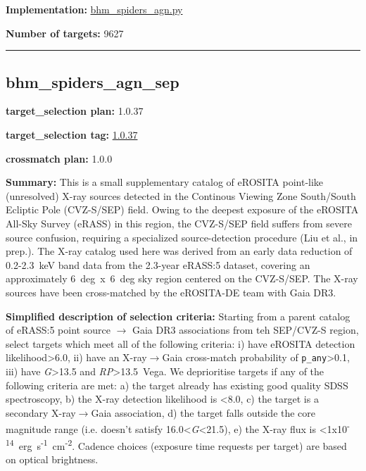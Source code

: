\noindent\textbf{Implementation:}
\href{https://github.com/sdss/target_selection/blob/1.0.37/python/target_selection/cartons/bhm_spiders_agn.py}{bhm\_spiders\_agn.py}

\noindent\textbf{Number of targets:} 9627

\begin{center}\rule{0.5\linewidth}{0.5pt}\end{center}

\hypertarget{bhm_spiders_agn_sep_plan1.0.37}{%
\subsection{bhm\_spiders\_agn\_sep}\label{bhm_spiders_agn_sep_plan1.0.37}}

\noindent\textbf{target\_selection plan:} 1.0.37

\noindent\textbf{target\_selection tag:}
\href{https://github.com/sdss/target_selection/tree/1.0.37/}{1.0.37}

\noindent\textbf{crossmatch plan:} 1.0.0

\noindent\textbf{Summary:} This is a small supplementary catalog of eROSITA
point-like (unresolved) X-ray sources detected in the Continous Viewing
Zone South/South Ecliptic Pole (CVZ-S/SEP) field. Owing to the deepest
exposure of the eROSITA All-Sky Survey (eRASS) in this region, the
CVZ-S/SEP field suffers from severe source confusion, requiring a
specialized source-detection procedure (Liu et al., in prep.). The X-ray
catalog used here was derived from an early data reduction of
0.2-2.3~keV band data from the 2.3-year eRASS:5 dataset, covering an
approximately 6~deg~x~6~deg sky region centered on the CVZ-S/SEP. The
X-ray sources have been cross-matched by the eROSITA-DE team with Gaia
DR3.

\noindent\textbf{Simplified description of selection criteria:} Starting from a
parent catalog of eRASS:5 point source $\rightarrow$ Gaia DR3 associations from teh
SEP/CVZ-S region, select targets which meet all of the following
criteria: i) have eROSITA detection likelihood\textgreater6.0, ii) have
an X-ray$\rightarrow$Gaia cross-match probability of \texttt{p\_any}\textgreater0.1,
iii) have \emph{G}\textgreater13.5 and \emph{RP}\textgreater13.5~Vega.
We deprioritise targets if any of the following criteria are met: a) the
target already has existing good quality SDSS spectroscopy, b) the X-ray
detection likelihood is \textless8.0, c) the target is a secondary
X-ray$\rightarrow$Gaia association, d) the target falls outside the core magnitude
range (i.e. doesn't satisfy 16.0\textless{}\emph{G}\textless21.5), e)
the X-ray flux is
\textless1x10\textsuperscript{-14}~erg~s\textsuperscript{-1}~cm\textsuperscript{-2}.
Cadence choices (exposure time requests per target) are based on optical
brightness.


